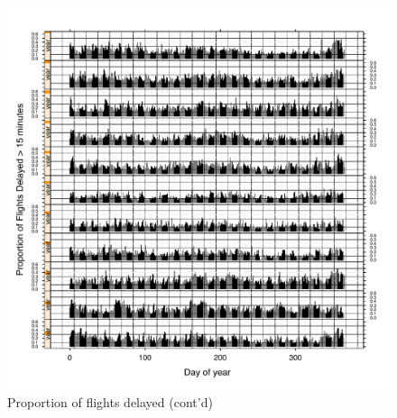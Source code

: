 \documentclass[letterpaper,10pt,english]{sphinxmanual}
\begin{document}
\begin{figure}[htbp]
\centering
\capstart

\includegraphics{propdelayed_2.pdf}
\caption{Proportion of flights delayed (cont'd)}\end{figure}
\end{document}
